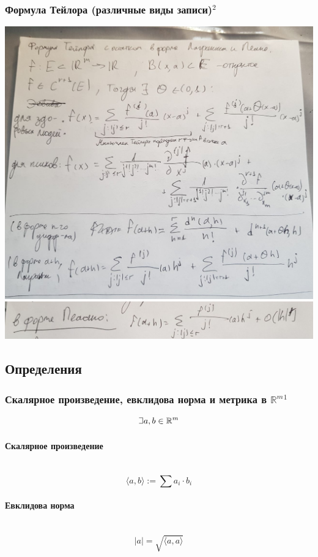 \documentclass{article}
\def\letus{%
\mathord{\setbox0=\hbox{$\exists$}%
         \hbox{\kern 0.125\wd0%
               \vbox to \ht0{%
                  \hrule width 0.75\wd0%
                  \vfill%
                  \hrule width 0.75\wd0}%
               \vrule height \ht0%
               \kern 0.125\wd0}%
       }%
        }
\let\vanillaparagraph\paragraph
\renewcommand{\paragraph}[1]{\vanillaparagraph{#1}\mbox{}\\}
\begin{document}
\subsubsection{Формула Тейлора (различные виды записи)\texorpdfstring{$^2$}{}}

\includegraphics[width=\textwidth]{../images/teilor1.jpg}
\includegraphics[width=\textwidth]{../images/teilor2.jpg}

\newpage
\subsection{Определения}

\subsubsection{Скалярное произведение, евклидова норма и метрика в \texorpdfstring{$\mathbb{R}^m$}{R\^m}\texorpdfstring{$^1$}{}}
$$
\letus a, b \in \mathbb{R}^m
$$
\paragraph{Скалярное произведение}
$$
\langle a, b \rangle := \sum a_i \cdot b_i
$$

\paragraph{Евклидова норма}
$$
|a| = \sqrt{\langle a, a\rangle}
$$
\end{document}

